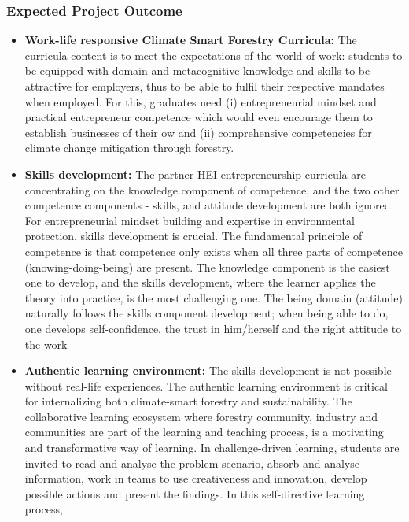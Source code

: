 \documentclass[
  11pt,
]{article}
\begin{document}
\hypertarget{expected-project-outcome}{%
\subsubsection{Expected Project
Outcome}\label{expected-project-outcome}}

\begin{itemize}
\item
  \textbf{Work-life responsive Climate Smart Forestry Curricula:} The
  curricula content is to meet the expectations of the world of work:
  students to be equipped with domain and metacognitive knowledge and
  skills to be attractive for employers, thus to be able to fulfil their
  respective mandates when employed. For this, graduates need (i)
  entrepreneurial mindset and practical entrepreneur competence which
  would even encourage them to establish businesses of their ow and (ii)
  comprehensive competencies for climate change mitigation through
  forestry.
\item
  \textbf{Skills development:} The partner HEI entrepreneurship
  curricula are concentrating on the knowledge component of competence,
  and the two other competence components - skills, and attitude
  development are both ignored. For entrepreneurial mindset building and
  expertise in environmental protection, skills development is crucial.
  The fundamental principle of competence is that competence only exists
  when all three parts of competence (knowing-doing-being) are present.
  The knowledge component is the easiest one to develop, and the skills
  development, where the learner applies the theory into practice, is
  the most challenging one. The being domain (attitude) naturally
  follows the skills component development; when being able to do, one
  develops self-confidence, the trust in him/herself and the right
  attitude to the work
\item
  \textbf{Authentic learning environment:} The skills development is not
  possible without real-life experiences. The authentic learning
  environment is critical for internalizing both climate-smart forestry
  and sustainability. The collaborative learning ecosystem where
  forestry community, industry and communities are part of the learning
  and teaching process, is a motivating and transformative way of
  learning. In challenge-driven learning, students are invited to read
  and analyse the problem scenario, absorb and analyse information, work
  in teams to use creativeness and innovation, develop possible actions
  and present the findings. In this self-directive learning process,

\end{itemize}
\end{document}
